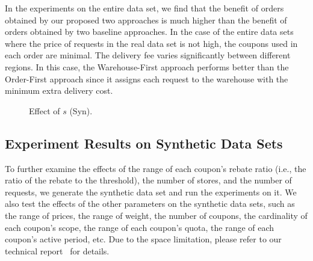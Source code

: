 In the experiments on the entire data set, we find that the benefit of orders obtained by our proposed two approaches is much higher than the benefit of orders obtained by two baseline approaches. In the case of the entire data sets where the price of requests in the real data set is not high, the coupons used in each order are minimal. The delivery fee varies significantly between different regions. In this case, the Warehouse-First approach performs better than the Order-First approach since it assigns each request to the warehouse with the minimum extra delivery cost.

\begin{figure}[t!]\centering\vspace{-2ex}
	\subfigcapskip=-5pt
	\vspace{-2ex}
	\addtocounter{subfigure}{-1}
	\figureCaptionMargin
	\vspace{1ex}
	\caption{\small Effect of $s$ (Syn).}\figureBelowMargin
	\label{fig:syn_stores}\vspace{-1ex}
\end{figure}

\vspace{-1ex}

\subsection{Experiment Results on Synthetic Data Sets}\vspace{-0.5ex}

To further examine the effects of the range of each coupon's rebate ratio (i.e., the ratio of the rebate to the threshold), the number of stores, and the number of requests, we generate the synthetic data set and run the experiments on it.
We also test the effects of the other parameters on the synthetic data sets, such as the range of prices, the range of weight, the number of coupons, the cardinality of each coupon's scope, the range of each coupon's quota, the range of each coupon's active period, etc. Due to the space limitation, please refer to our technical report~\cite{Report} for details.




